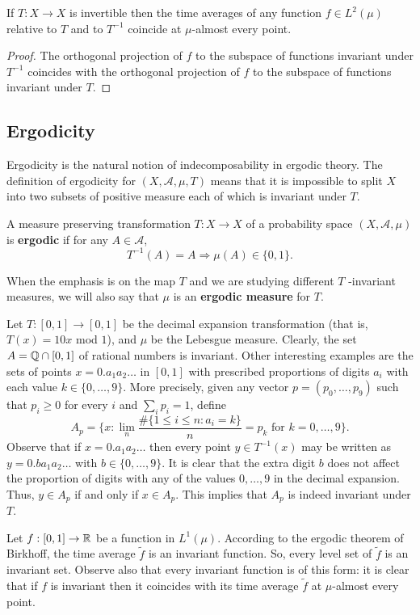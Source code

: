 \begin{corollary}
If $T:X\to X$ is invertible then the time averages of any function $f\in L^2(\mu)$ relative to $T$ and to $T^{-1}$ coincide at $\mu$-almost every point.
\end{corollary}
\begin{proof}
The orthogonal projection of $f$ to the subspace of functions invariant under $T^{-1}$ coincides with the orthogonal projection of $f$ to the subspace of functions invariant under $T$.
\end{proof}
\subsection{Ergodicity}
Ergodicity is the natural notion of indecomposability in ergodic theory. The definition of ergodicity for $(X,\mathcal{A},\mu,T)$ means that it is impossible to split $X$ into two subsets of positive measure each of which is invariant under $T$.
\begin{definition}
A measure preserving transformation $T:X\to X$ of a probability space $(X,\mathcal{A},\mu)$ is \textbf{ergodic} if for any $A\in\mathcal{A}$,
\[T^{-1}(A)=A\Longrightarrow\mu(A)\in\{0,1\}.\]
\end{definition}
When the emphasis is on the map $T$ and we are studying different $T$ -invariant measures, we will also say that $\mu$ is an \textbf{ergodic measure} for $T$. 
\begin{example}
Let $T:[0,1]\to[0,1]$ be the decimal expansion transformation (that is, $T(x)=10x$ mod $1$), and $\mu$ be the Lebesgue measure. Clearly, the set $A=\mathbb{Q}\cap[0,1]$ of rational numbers is invariant. Other interesting examples are the sets of points $x=0.a_1a_2\dots$ in $[0,1]$ with prescribed proportions of digits $a_i$ with each value $k\in\{0,\dots,9\}$. More precisely, given any vector $p=(p_0,\dots,p_9)$ such that $p_i\geq 0$ for every $i$ and $\sum_ip_i=1$, define
\[A_p=\{x:\lim_n\frac{\#\{1\leq i\leq n:a_i=k\}}{n}=p_k\text{ for $k=0,\dots,9$}\}.\]
Observe that if $x=0.a_1a_2\dots$ then every point $y\in T^{-1}(x)$ may be written as $y=0.ba_1a_2\dots$ with $b\in\{0,\dots,9\}$. It is clear that the extra digit $b$ does not affect the proportion of digits with any of the values $0,\dots,9$ in the decimal expansion. Thus, $y\in A_p$ if and only if $x\in A_p$. This implies that $A_p$ is indeed invariant under $T$.
\end{example}
\begin{example}
Let $f:[0,1]\to\mathbb{R}$ be a function in $L^1(\mu)$. According to the ergodic theorem of Birkhoff, the time average $\tilde{f}$ is an invariant function. So, every level set of $\tilde{f}$ is an invariant set. Observe also that every invariant function is of this form: it is clear that if $f$ is invariant then it coincides with its time average $\tilde{f}$ at $\mu$-almost every point.
\end{example}
